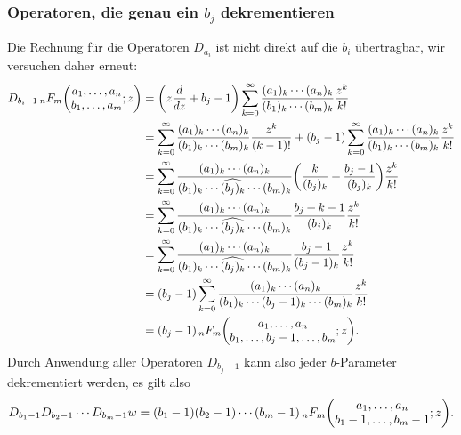 \subsubsection{Operatoren, die genau ein $b_j$ dekrementieren}
Die Rechnung für die Operatoren $D_{a_i}$ ist nicht direkt auf die
$b_i$ übertragbar, wir versuchen daher erneut:
\begin{align*}
D_{b_i-1}
\,\mathstrut_nF_m
\biggl(
\begin{matrix}a_1,\dots,a_n\\b_1,\dots,a_m\end{matrix};z
\biggr)
&=
\biggl(z\frac{d}{dz}+b_j-1\biggr)
\sum_{k=0}^\infty
\frac{(a_1)_k\cdots (a_n)_k}{(b_1)_k\cdots (b_m)_k}
\frac{z^k}{k!}
\\
&=
\sum_{k=0}^\infty
\frac{(a_1)_k\cdots (a_n)_k}{(b_1)_k\cdots (b_m)_k}
\frac{z^k}{(k-1)!}
+
(b_j-1)
\sum_{k=0}^\infty
\frac{(a_1)_k\cdots (a_n)_k}{(b_1)_k\cdots (b_m)_k}
\frac{z^k}{k!}
\\
&=
\sum_{k=0}^\infty
\frac{(a_1)_k\cdots (a_n)_k}{(b_1)_k\cdots\widehat{(b_j)_k}\cdots (b_m)_k}
\biggl(\frac{k}{(b_j)_k}+\frac{b_j-1}{(b_j)_k}\biggr)
\frac{z^k}{k!}
\\
&=
\sum_{k=0}^\infty
\frac{(a_1)_k\cdots (a_n)_k}{(b_1)_k\cdots \widehat{(b_j)_k}\cdots (b_m)_k}
\frac{b_j+k-1}{(b_j)_k}
\frac{z^k}{k!}
\\
&=
\sum_{k=0}^\infty
\frac{(a_1)_k\cdots (a_n)_k}{(b_1)_k\cdots \widehat{(b_j)_k}\cdots (b_m)_k}
\frac{b_j-1}{(b_j-1)_k}
\frac{z^k}{k!}
\\
&=
(b_j-1)
\sum_{k=0}^\infty
\frac{(a_1)_k\cdots (a_n)_k}{(b_1)_k\cdots(b_j-1)_k\cdots (b_m)_k}
\frac{z^k}{k!}
\\
&=(b_j-1)
\,
\mathstrut_nF_m\biggl(
\begin{matrix}a_1,\dots,a_n\\
b_1,\dots,b_j-1,\dots,b_m
\end{matrix}
;z
\biggr).
\end{align*}
Durch Anwendung aller Operatoren $D_{b_j-1}$ kann also jeder $b$-Parameter
dekrementiert werden, es gilt also
\[
D_{b_1-1}D_{b_2-1}\cdots D_{b_m-1}w
=
(b_1-1)(b_2-1)\cdots(b_m-1) \,
\mathstrut_nF_m\biggl(
\begin{matrix}
a_1,\dots,a_n\\
b_1-1,\dots,b_m-1
\end{matrix}
;z
\biggr).
\]

